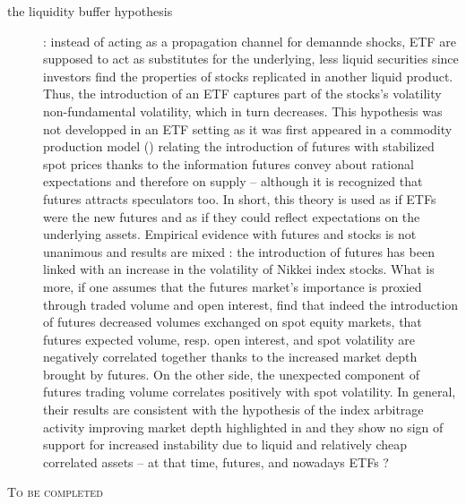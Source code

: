 \begin{description}
  \item[the liquidity buffer hypothesis]: instead of acting as a propagation channel for demannde shocks, ETF are supposed to act as substitutes for the underlying, less liquid securities since investors find the properties of stocks replicated in another liquid product. Thus, the introduction of an ETF captures part of the stocks's volatility non-fundamental volatility, which in turn decreases. This hypothesis was not developped in an ETF setting as it was first appeared in a commodity production model (\textcite{Danthine1978}) relating the introduction of futures with stabilized spot prices thanks to the information futures convey about rational expectations and therefore on supply -- although it is recognized that futures attracts speculators too. In short, this theory is used as if ETFs were the new futures and as if they could reflect expectations on the underlying assets. Empirical evidence with futures and stocks is not unanimous and results are mixed : the introduction of futures has been linked with an increase in the volatility of Nikkei index stocks. What is more, if one assumes that the futures market's importance is proxied through traded volume and open interest, \textcite{Bessembinder1992} find that indeed the introduction of futures decreased volumes exchanged on spot equity markets, that futures expected volume, resp. open interest, and spot volatility are negatively correlated together thanks to the increased market depth brought by futures. On the other side, the unexpected component of futures trading volume correlates positively with spot volatility. In general, their results are consistent with the hypothesis of the index arbitrage activity improving market depth highlighted in \textcite{Grossman1988} and they show no sign of support for increased instability due to liquid and relatively cheap correlated assets -- at that time, futures, and nowadays ETFs ?  
\end{description}

\begin{center}
  \textsc{To be completed}
  \end{center}
